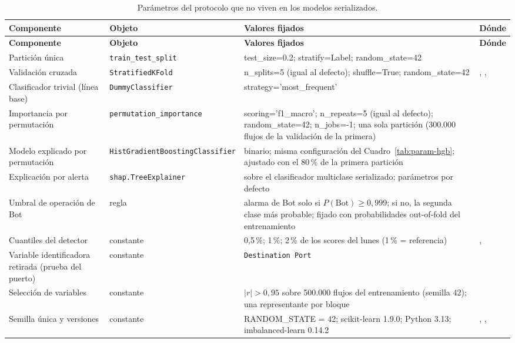 \documentclass[11pt,a4paper]{article}
\begin{document}
{\clearpage%
\begin{longtable}{L{2.9cm} L{3.5cm} L{4.3cm} L{3.2cm}}
\caption{Parámetros del protocolo que no viven en los modelos serializados.}\label{tab:param-protocolo}\\
\toprule
\textbf{Componente} & \textbf{Objeto} & \textbf{Valores fijados} & \textbf{Dónde} \\
\midrule
\endfirsthead
\toprule
\textbf{Componente} & \textbf{Objeto} & \textbf{Valores fijados} & \textbf{Dónde} \\
\midrule
\endhead
\bottomrule
\endfoot
Partición única & \texttt{train\_test\_split} & test\_size=0.2; stratify=Label; random\_state=42 &  \\
Validación cruzada & \texttt{StratifiedKFold} & n\_splits=5 (igual al defecto); shuffle=True; random\_state=42 & , ,  \\
Clasificador trivial (línea base) & \texttt{DummyClassifier} & strategy='most\_frequent' &  \\
Importancia por permutación & \texttt{permutation\_\allowbreak importance} & scoring='f1\_macro'; n\_repeats=5 (igual al defecto); random\_state=42; n\_jobs=-1; una sola partición (300.000 flujos de la validación de la primera) &  \\
Modelo explicado por permutación & \texttt{HistGradient\allowbreak Boosting\allowbreak Classifier} & binario; misma configuración del Cuadro~\ref{tab:param-hgb}; ajustado con el 80\,\% de la primera partición &  \\
Explicación por alerta & \texttt{shap.TreeExplainer} & sobre el clasificador multiclase serializado; parámetros por defecto &  \\
Umbral de operación de Bot & regla & alarma de Bot solo si $P(\mathrm{Bot}) \geq 0{,}999$; si no, la segunda clase más probable; fijado con probabilidades out-of-fold del entrenamiento &  \\
Cuantiles del detector & constante & 0{,}5\,\%; 1\,\%; 2\,\% de los scores del lunes (1\,\% = referencia) & ,  \\
Variable identificadora retirada (prueba del puerto) & constante & \texttt{Destination Port} &  \\
Selección de variables & constante & $|r| > 0{,}95$ sobre 500.000 flujos del entrenamiento (semilla 42); una representante por bloque &  \\
Semilla única y versiones & constante & RANDOM\_STATE = 42; scikit-learn 1.9.0; Python 3.13; imbalanced-learn 0.14.2 & , ,  \\
\end{longtable}
}
\end{document}
